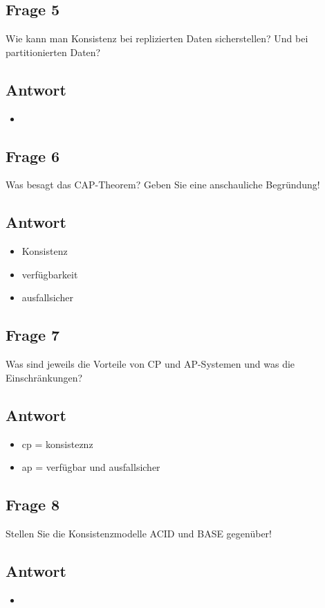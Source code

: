 \subsection*{Frage 5}
Wie kann man Konsistenz bei replizierten Daten sicherstellen? Und bei partitionierten Daten?
\subsection*{Antwort}
\begin{itemize}
	\item 
\end{itemize}
\subsection*{Frage 6}
Was besagt das CAP-Theorem? Geben Sie eine anschauliche Begründung!
\subsection*{Antwort}
\begin{itemize}
	\item Konsistenz
	\item verfügbarkeit
	\item ausfallsicher
\end{itemize}
\subsection*{Frage 7}
Was sind jeweils die Vorteile von CP und AP-Systemen und was die Einschränkungen?
\subsection*{Antwort}
\begin{itemize}
	\item cp = konsisteznz
	\item ap = verfügbar und ausfallsicher
\end{itemize}
\subsection*{Frage 8}
Stellen Sie die Konsistenzmodelle ACID und BASE gegenüber!
\subsection*{Antwort}
\begin{itemize}
	\item 
\end{itemize}